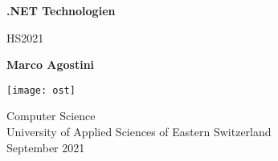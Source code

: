 \begin{titlepage}
    \begin{center}
        \vspace*{1cm}
            
        \Huge
        \textbf{.NET Technologien}
            
        \vspace{0.5cm}
        \LARGE
        HS2021
            
        \vspace{1.5cm}
            
        \textbf{Marco Agostini}
            
        \vfill
            
            
        \vspace{0.8cm}
            
        \texttt{[image: ost]}
            
        \Large
        Computer Science\\
        University of Applied Sciences of Eastern Switzerland\\
        September 2021
        

    \end{center}
\end{titlepage}

\tableofcontents

\pagebreak


